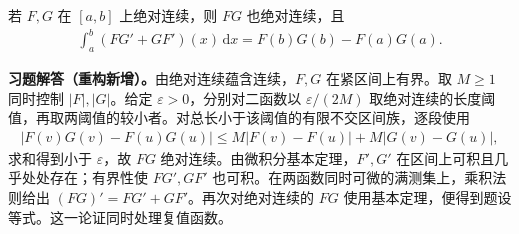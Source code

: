 \documentclass[../../main.tex]{subfiles}%
\begin{document}
\begin{exercise}\label{exercise:ch03-ac-product-parts}
若 $F,G$ 在 $[a,b]$ 上绝对连续，则 $FG$ 也绝对连续，且
\begin{align*}
\int_a^b(FG'+GF')(x)\,\mathrm dx=F(b)G(b)-F(a)G(a).
\end{align*}
\end{exercise}
\begin{solution}
\label{solution:ch03-ac-product-parts}
\textbf{习题解答（重构新增）。}由绝对连续蕴含连续，$F,G$ 在紧区间上有界。取 $M\ge1$ 同时控制 $|F|,|G|$。给定 $\varepsilon>0$，分别对二函数以 $\varepsilon/(2M)$ 取绝对连续的长度阈值，再取两阈值的较小者。对总长小于该阈值的有限不交区间族，逐段使用
\begin{align*}
|F(v)G(v)-F(u)G(u)|
\le M|F(v)-F(u)|+M|G(v)-G(u)|,
\end{align*}
求和得到小于 $\varepsilon$，故 $FG$ 绝对连续。由微积分基本定理，$F',G'$ 在区间上可积且几乎处处存在；有界性使 $FG',GF'$ 也可积。在两函数同时可微的满测集上，乘积法则给出 $(FG)'=FG'+GF'$。再次对绝对连续的 $FG$ 使用基本定理，便得到题设等式。这一论证同时处理复值函数。
\end{solution}
\end{document}
